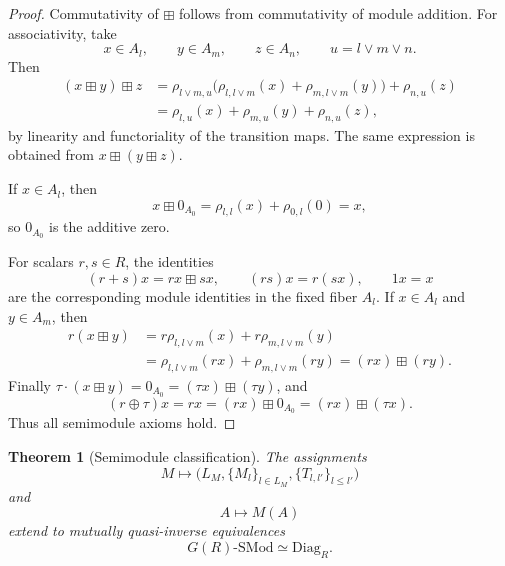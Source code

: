 \documentclass[11pt]{article}
\newcommand{\1}{\mathbf 1}
\newcommand{\SMod}{\mathrm{SMod}}
\newcommand{\Diag}{\mathrm{Diag}}
\newtheorem{theorem}{Theorem}[section]
\numberwithin{equation}{section}
\begin{document}
\begin{proof}
Commutativity of $\boxplus$ follows from commutativity of module addition.  For associativity, take
\begin{equation}
  x\in A_l,
  \qquad y\in A_m,
  \qquad z\in A_n,
  \qquad u=l\vee m\vee n.
\end{equation}
Then
\begin{align}
  (x\boxplus y)\boxplus z
  &=\rho_{l\vee m,u}\bigl(\rho_{l,l\vee m}(x)+\rho_{m,l\vee m}(y)\bigr)+\rho_{n,u}(z)\nonumber\\
  &=\rho_{l,u}(x)+\rho_{m,u}(y)+\rho_{n,u}(z),
\end{align}
by linearity and functoriality of the transition maps.  The same expression is obtained from $x\boxplus(y\boxplus z)$.

If $x\in A_l$, then
\begin{equation}
  x\boxplus 0_{A_0}=\rho_{l,l}(x)+\rho_{0,l}(0)=x,
\end{equation}
so $0_{A_0}$ is the additive zero.

For scalars $r,s\in R$, the identities
\begin{equation}
  (r+s)x=rx\boxplus sx,
  \qquad
  (rs)x=r(sx),
  \qquad
  1x=x
\end{equation}
are the corresponding module identities in the fixed fiber $A_l$.  If $x\in A_l$ and $y\in A_m$, then
\begin{align}
  r(x\boxplus y)&=r\rho_{l,l\vee m}(x)+r\rho_{m,l\vee m}(y)\nonumber\\
  &=\rho_{l,l\vee m}(rx)+\rho_{m,l\vee m}(ry)
  =(rx)\boxplus(ry).
\end{align}
Finally $\tau\cdot(x\boxplus y)=0_{A_0}=(\tau x)\boxplus(\tau y)$, and
\begin{equation}
  (r\oplus\tau)x=rx=(rx)\boxplus 0_{A_0}=(rx)\boxplus(\tau x).
\end{equation}
Thus all semimodule axioms hold.
\end{proof}

\begin{theorem}[Semimodule classification]\label{thm:semimodule-classification}
The assignments
\begin{equation}
  M\longmapsto \bigl(L_M,\{M_l\}_{l\in L_M},\{T_{l,l'}\}_{l\le l'}\bigr)
\end{equation}
and
\begin{equation}
  A\longmapsto M(A)
\end{equation}
extend to mutually quasi-inverse equivalences
\begin{equation}\label{eq:SMod-Diag-equivalence}
  G(R)\text{-}\SMod\simeq \Diag_R.
\end{equation}
\end{theorem}
\end{document}
